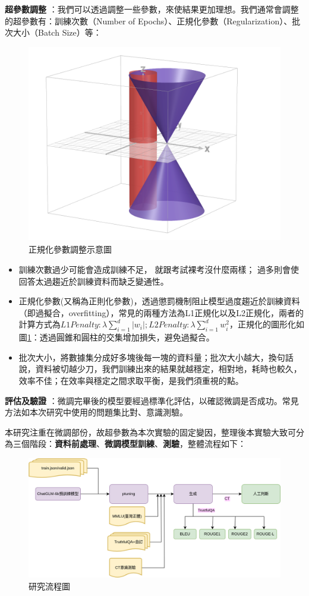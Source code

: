 \documentclass[12pt,a4paper,MingLiU,UTF8,natbib]{article}
\def\xeCJKembold{0.4}
\def\saveCJKnode{\dimen255\lastkern}
\def\restoreCJKnode{\kern-\dimen255\kern\dimen255}
\let\CJKoldsymbol\CJKsymbol
\let\CJKoldpunctsymbol\CJKpunctsymbol
\def\CJKfakeboldsymbol#1{%
	\special{pdf:literal direct 2 Tr \xeCJKembold\space w}%
	\CJKoldsymbol{#1}%
	\saveCJKnode
	\special{pdf:literal direct 0 Tr}%
	\restoreCJKnode}
\def\CJKfakeboldpunctsymbol#1{%
	\special{pdf:literal direct 2 Tr \xeCJKembold\space w}%
	\CJKoldpunctsymbol{#1}%
	\saveCJKnode
	\special{pdf:literal direct 0 Tr}%
	\restoreCJKnode}
\newcommand\CJKfakebold[1]{%
	\let\CJKsymbol\CJKfakeboldsymbol
	\let\CJKpunctsymbol\CJKfakeboldpunctsymbol
	#1%
	\let\CJKsymbol\CJKoldsymbol
	\let\CJKpunctsymbol\CJKoldpunctsymbol}
\begin{document}
	\CJKfakebold{\textbf{超參數調整}}：我們可以透過調整一些參數，來使結果更加理想。我們通常會調整的超參數有：訓練次數（Number of Epochs）、正規化參數（Regularization）、批次大小（Batch Size）等：
	\begin{figure}
		\includegraphics[width=.4\textwidth]{penalty}
		\caption{正規化參數調整示意圖}
		\label{fig:reg}
	\end{figure}
	\begin{itemize}
		\item 訓練次數過少可能會造成訓練不足，
		就跟考試裸考沒什麼兩樣；
		過多則會使回答太過趨近於訓練資料而缺乏變通性。
		\item 正規化參數(又稱為正則化參數)，透過懲罰機制阻止模型過度趨近於訓練資料（即過擬合，overfitting），常見的兩種方法為L1正規化以及L2正規化，兩者的計算方式為$L1 Penalty:\lambda\sum_{i=1}^{d}|w_i|;L2 Penalty:\lambda\sum_{i=1}^{d}w^2_i$，正規化的圖形化如圖\ref{fig:reg}：透過圓錐和圓柱的交集增加損失，避免過擬合。
		

	
		\item 批次大小，將數據集分成好多塊後每一塊的資料量；批次大小越大，換句話說，資料被切越少刀，我們訓練出來的結果就越穩定，相對地，耗時也較久，效率不佳；在效率與穩定之間求取平衡，是我們須重視的點。
	\end{itemize}
	
	\CJKfakebold{\textbf{評估及驗證}}：微調完畢後的模型要經過標準化評估，以確認微調是否成功。常見方法如本次研究中使用的問題集比對、意識測驗。
	
	本研究注重在微調部份，故超參數為本次實驗的固定變因，整理後本實驗大致可分為三個階段：\textbf{資料前處理}、\textbf{微調模型訓練}、\textbf{測驗}，整體流程如下：
	
	\begin{figure}[H]
		\centering
	\includegraphics[width=\textwidth]{flowofstudy}
	\caption{研究流程圖}
	\end{figure}
	
\end{document}
